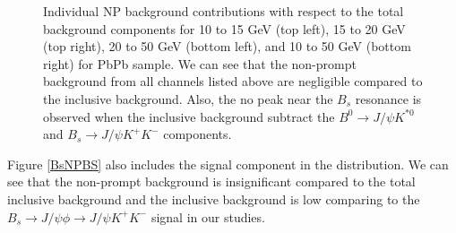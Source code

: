 \begin{figure}[ht!]
\caption{Individual NP background contributions with respect to the total background components for 10 to 15 GeV (top left), 15 to 20 GeV (top right), 20 to 50 GeV (bottom left), and 10 to 50 GeV (bottom right) for PbPb sample. We can see that the non-prompt background from all channels listed above are negligible compared to the inclusive background. Also, the no peak near the $B_s$ resonance is observed when the inclusive background subtract the $B^0 \rightarrow J/\psi  K^{*0} $ and $B_s \rightarrow J/\psi  K^+ K^-$ components.}
\label{BsNPbkgd}
\end{figure}


Figure \ref{BsNPBS} also includes the signal component in the distribution. We can see that the non-prompt background is insignificant compared to the total inclusive background and the inclusive background is low comparing to the $B_s \rightarrow J/\psi \phi \rightarrow J/\psi K^+ K^-$ signal in our studies.
 
 
 
